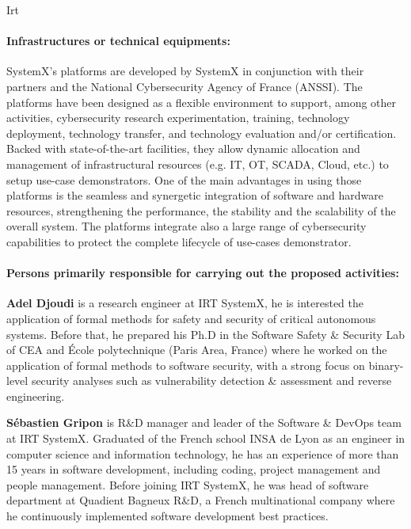 \begin{sitedescription}{Irt}
\paragraph*{Infrastructures or technical equipments:}

SystemX’s platforms are developed by SystemX in conjunction with their partners and the National Cybersecurity Agency of France (ANSSI). The platforms have been designed as a flexible environment to support, among other activities, cybersecurity research experimentation, training, technology deployment, technology transfer, and technology evaluation and/or certification.  Backed with state-of-the-art facilities, they allow dynamic allocation and management of infrastructural resources (e.g. IT, OT, SCADA, Cloud, etc.) to setup use-case demonstrators. One of the main advantages in using those platforms is the seamless and synergetic integration of software and hardware resources, strengthening the performance, the stability and the scalability of the overall system. The platforms integrate also a large range of cybersecurity capabilities to protect the complete lifecycle of use-cases demonstrator.





\paragraph*{Persons primarily responsible for carrying out the proposed activities:}

\begin{compactitem} %

\item{\bf Adel Djoudi} is a research engineer at IRT SystemX, he is interested the application of formal methods for safety and security of critical autonomous systems. Before that, he prepared his Ph.D in the Software Safety \& Security Lab of CEA and École polytechnique (Paris Area, France) where he worked on the application of formal methods to software security, with a strong focus on binary-level security analyses such as vulnerability detection \& assessment and reverse engineering.

\item{\bf Sébastien Gripon} is R\&D manager and leader of the Software \& DevOps team at IRT SystemX. Graduated of the French school INSA de Lyon as an engineer in computer science and information technology, he has an experience of more than 15 years in software development, including coding, project management and people management. Before joining IRT SystemX, he was head of software department at Quadient Bagneux R\&D, a French multinational company where he continuously implemented software development best practices.


\end{compactitem}
\end{sitedescription}
